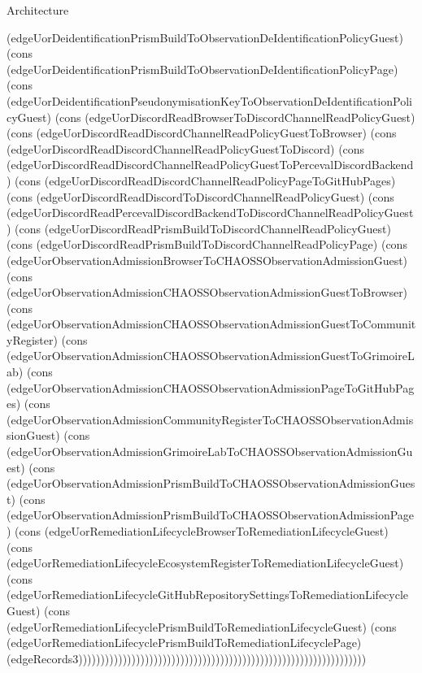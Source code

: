 \begin{lexlean}{Architecture}
\begin{semanticmodule}
{(edgeUorDeidentificationPrismBuildToObservationDeIdentificationPolicyGuest) (cons (edgeUorDeidentificationPrismBuildToObservationDeIdentificationPolicyPage) (cons (edgeUorDeidentificationPseudonymisationKeyToObservationDeIdentificationPolicyGuest) (cons (edgeUorDiscordReadBrowserToDiscordChannelReadPolicyGuest) (cons (edgeUorDiscordReadDiscordChannelReadPolicyGuestToBrowser) (cons (edgeUorDiscordReadDiscordChannelReadPolicyGuestToDiscord) (cons (edgeUorDiscordReadDiscordChannelReadPolicyGuestToPercevalDiscordBackend) (cons (edgeUorDiscordReadDiscordChannelReadPolicyPageToGitHubPages) (cons (edgeUorDiscordReadDiscordToDiscordChannelReadPolicyGuest) (cons (edgeUorDiscordReadPercevalDiscordBackendToDiscordChannelReadPolicyGuest) (cons (edgeUorDiscordReadPrismBuildToDiscordChannelReadPolicyGuest) (cons (edgeUorDiscordReadPrismBuildToDiscordChannelReadPolicyPage) (cons (edgeUorObservationAdmissionBrowserToCHAOSSObservationAdmissionGuest) (cons (edgeUorObservationAdmissionCHAOSSObservationAdmissionGuestToBrowser) (cons (edgeUorObservationAdmissionCHAOSSObservationAdmissionGuestToCommunityRegister) (cons (edgeUorObservationAdmissionCHAOSSObservationAdmissionGuestToGrimoireLab) (cons (edgeUorObservationAdmissionCHAOSSObservationAdmissionPageToGitHubPages) (cons (edgeUorObservationAdmissionCommunityRegisterToCHAOSSObservationAdmissionGuest) (cons (edgeUorObservationAdmissionGrimoireLabToCHAOSSObservationAdmissionGuest) (cons (edgeUorObservationAdmissionPrismBuildToCHAOSSObservationAdmissionGuest) (cons (edgeUorObservationAdmissionPrismBuildToCHAOSSObservationAdmissionPage) (cons (edgeUorRemediationLifecycleBrowserToRemediationLifecycleGuest) (cons (edgeUorRemediationLifecycleEcosystemRegisterToRemediationLifecycleGuest) (cons (edgeUorRemediationLifecycleGitHubRepositorySettingsToRemediationLifecycleGuest) (cons (edgeUorRemediationLifecyclePrismBuildToRemediationLifecycleGuest) (cons (edgeUorRemediationLifecyclePrismBuildToRemediationLifecyclePage) (edgeRecords3)))))))))))))))))))))))))))))))))))))))))))))))))))))))))))))))))
}


\end{semanticmodule}
\end{lexlean}
